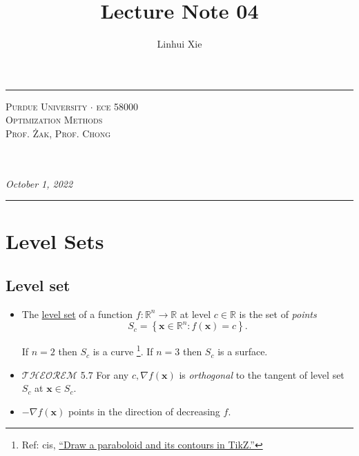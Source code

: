 \documentclass[12pt,thmsa]{article}
\author{Linhui Xie}
\title{Lecture Note 04}
\makeatletter
\def\maketitle{%
	\par
	\hrule height 1.5pt\vspace{1ex}
	\par\noindent
	
	\begin{minipage}{0.5\textwidth}
		\scshape
		Purdue University \(\cdot\) ece 58000 \\[1ex]
		Optimization Methods \\
		Prof. Żak, Prof. Chong
	\end{minipage}
	\begin{minipage}{0.45\textwidth}
		\raggedleft
		\MakeTextUppercase{{\@title}}\\[0.3ex] %
		\textit{\@author}\\[0.2ex]
		\textit{October 1, 2022}
	\end{minipage}
	\par\vspace{1ex}
	\hrule height 1.5pt\vspace{1ex}
	\par
}
\makeatother
\begin{document}
\maketitle

\setcounter{section}{3}
\section{Level Sets}

\setcounter{section}{4}

\subsection{Level set }

\begin{itemize}
	\item The \underline{level set} of a function \(f: \mathbb{R}^n \rightarrow \mathbb{R}\) at level \(c \in \mathbb{R}\) is the set of \textit{points}
	\[
	S_c =\left\{\boldsymbol{x} \in \mathbb{R}^n: f(\boldsymbol{x})=c\right\}.
	\]

	If \(n=2\) then \(S_c\) is a curve \footnote{Ref: cis, \href{https://tex.stackexchange.com/questions/641125/draw-a-paraboloid-and-its-contours-in-tikz}{``Draw a paraboloid and its contours in TikZ.''}}. If \(n=3\) then \(S_c\) is a surface.
	
	\item \(\mathscr{THEOREM}\) 5.7 For any \(c, \nabla f(\boldsymbol{x})\) is \textit{orthogonal} to the tangent of level set \(S_c\) at \(\boldsymbol{x} \in S_c\).
	
	\item \(-\nabla f(\boldsymbol{x})\) points in the direction of decreasing \(f\).
\end{itemize}
\end{document}
